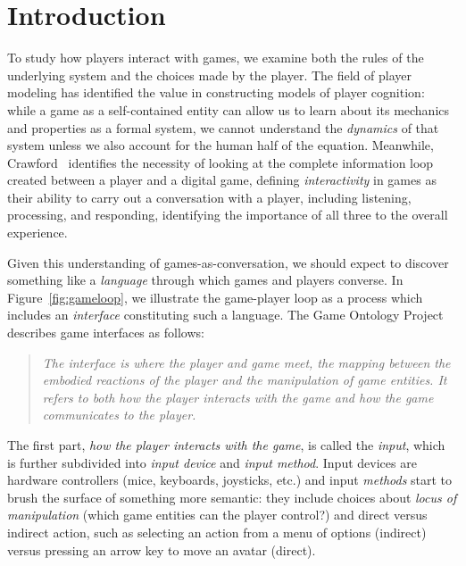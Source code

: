 \documentclass[sigconf]{acmart}
\begin{document}
\maketitle

\section{Introduction}

To study how players interact with games, we examine both the rules of the
underlying system and the choices made by the player. 
The field of player modeling has identified the
value in constructing models of player cognition: while a game as
a self-contained entity can allow us to learn about its mechanics and
properties as a formal system, we cannot understand the {\em dynamics} of
that system unless we also account for the human half of the equation.
Meanwhile, Crawford~\cite{crawford2003chris} identifies the necessity of
looking at the complete information loop created between a player and a
digital game, defining {\em interactivity} in games as their ability to
carry out a conversation with a player, including listening, processing,
and responding, identifying the importance of all three to the overall
experience.

Given this understanding of games-as-conversation, we should expect to
discover something like a {\em language} through which games and players converse. 
In Figure~\ref{fig:gameloop}, we illustrate the game-player loop as a
process which includes an {\em interface} constituting such a language.
The Game Ontology Project~\cite{zagal2007towards} describes game interfaces
as follows:
\begin{quote} \em
The interface is where the player and game meet, the mapping
between the embodied reactions of the player and the manipulation of game
entities. It refers to both how the player interacts with the game and how
the game communicates to the player.
\end{quote}
The first part, {\em how the player interacts with the game}, is
called the {\em input}, which is further subdivided into {\em input device}
and {\em input method}. Input devices are hardware controllers (mice,
keyboards, joysticks, etc.) and input {\em methods} start to brush the
surface of something more semantic: they include choices about {\em locus of
manipulation} (which game entities can the player control?) and direct
versus indirect action, such as selecting an action from a menu of options
(indirect) versus pressing an arrow key to move an avatar (direct).
\end{document}
